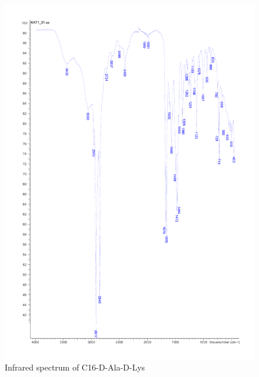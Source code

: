 \begin{figure}[ht!]
\centering
\includegraphics[scale=0.6]{IR/KAT1_35.pdf}
\caption{Infrared spectrum of C16-D-Ala-D-Lys}
\end{figure}